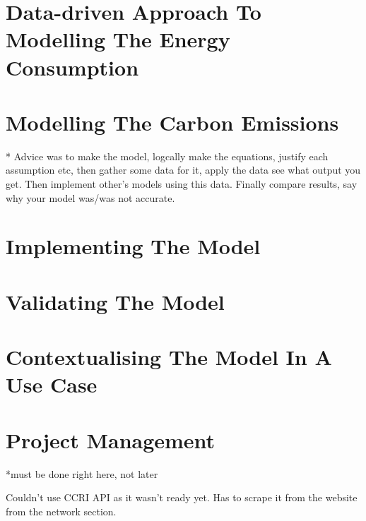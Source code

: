 \section {Data-driven Approach To Modelling The Energy Consumption}

\section {Modelling The Carbon Emissions }
* Advice was to make the model, logcally make the equations, justify each assumption etc, then gather some data for it, apply the data see what output you get. Then implement other's models using this data. Finally compare results, say why your model was/was not accurate.

\section {Implementing The Model}
\section {Validating The Model}
\section {Contextualising The Model In A Use Case}

\section {Project Management}
*must be done right here, not later

Couldn't use CCRI API as it wasn't ready yet. Has to scrape it from the website from the network section.